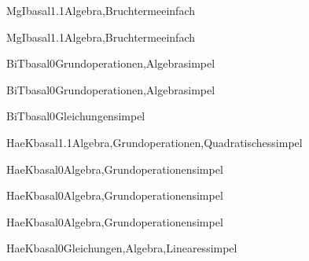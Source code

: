 \documentclass[12pt]{article}
\begin{document}
\begin{Add}{MgI}{basal1.1}{Algebra,Bruchterme}{einfach}
\end{Add}

\begin{Add}{MgI}{basal1.1}{Algebra,Bruchterme}{einfach}
\end{Add}



\begin{Add}{BiT}{basal0}{Grundoperationen,Algebra}{simpel}
\end{Add}

\begin{Add}{BiT}{basal0}{Grundoperationen,Algebra}{simpel}
\end{Add}

\begin{Add}{BiT}{basal0}{Gleichungen}{simpel}
      
\end{Add}


\begin{Add}{HaeK}{basal1.1}{Algebra,Grundoperationen,Quadratisches}{simpel}
\end{Add}

\begin{Add}{HaeK}{basal0}{Algebra,Grundoperationen}{simpel}
\end{Add}

\begin{Add}{HaeK}{basal0}{Algebra,Grundoperationen}{simpel}
\end{Add}

\begin{Add}{HaeK}{basal0}{Algebra,Grundoperationen}{simpel}
\end{Add}

\begin{Add}{HaeK}{basal0}{Gleichungen,Algebra,Lineares}{simpel}
      
\end{Add}
\end{document}
